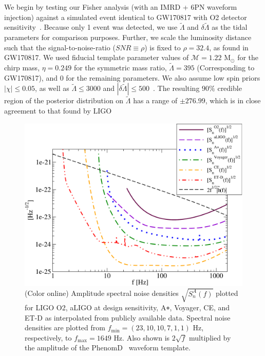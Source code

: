 \documentclass[prd,twocolumn,nofootinbib,superscriptaddress,amsmath,amssymb]{revtex4-1}
\begin{document}
We begin by testing our Fisher analysis (with an IMRD + 6PN waveform injection) against a simulated event identical to GW170817 with O2 detector sensitivity~\cite{aLIGO}. Because only 1 event was detected, we use $\tilde\Lambda$ and $\delta\tilde\Lambda$ as the tidal parameters for comparison purposes. Further, we scale the luminosity distance such that the signal-to-noise-ratio ($SNR \equiv \rho$) is fixed to $\rho=32.4$, as found in GW170817. We used fiducial template parameter values of $\mathcal{M}=1.22\text{ M}_\odot$ for the chirp mass, $\eta=0.249$ for the symmetric mass ratio, $\tilde\Lambda=395$ (Corresponding to GW170817), and $0$ for the remaining parameters. We also assume low spin priors $|\chi| \leq 0.05$, as well as $\tilde{\Lambda} \leq 3000$ and $|\delta \tilde{\Lambda}| \leq 500$~\cite{Wade:LambdaPriors}. The resulting $90\%$ credible region of the posterior distribution on $\tilde{\Lambda}$ has a range of $\pm 276.99$, which is in close agreement to that found by LIGO~\cite{TheLIGOScientific:2017qsa,Abbott2018}

\begin{figure}
\begin{center} 
\includegraphics[width=\columnwidth]{sensitivities.pdf}
\end{center}
\caption{(Color online)
Amplitude spectral noise densities $\sqrt{S_n^A(f)}$ plotted for LIGO O2, aLIGO at design sensitivity, A\texttt{+}, Voyager, CE, and ET-D as interpolated from publicly available data.
Spectral noise densities are plotted from $f_{\text{min}}=(23,10,10,7,1,1) \text{ Hz}$, respectively, to $f_{\text{max}}=1649 \text{ Hz}$.
Also shown is $2 \sqrt{f}$ multiplied by the amplitude of the PhenomD~\cite{PhenomDI,PhenomDII} waveform template.
}
\label{fig:sensitivities}
\end{figure}
\end{document}

